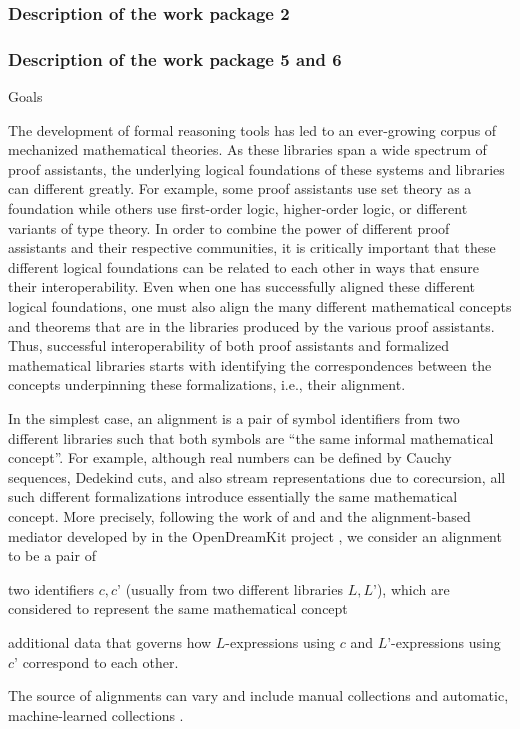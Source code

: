 \subsubsection{Description of the work package 2}

\subsubsection{Description of the work package 5 and 6}

{\color{red} Goals}

The development of formal reasoning tools has led to an ever-growing
corpus of mechanized mathematical theories. As these libraries span a
wide spectrum of proof assistants, the underlying logical foundations
of these systems and libraries can different greatly. For example,
some proof assistants use set theory as a foundation while others use
first-order logic, higher-order logic, or different variants of type
theory.  In order to combine the power of different proof assistants
and their respective communities, it is critically important that
these different logical foundations can be related to each other in
ways that ensure their interoperability.  Even when one has
successfully aligned these different logical foundations, one must
also align the many different mathematical concepts and theorems that
are in the libraries produced by the various proof assistants. Thus,
successful interoperability of both proof assistants and formalized
mathematical libraries starts with identifying the correspondences
between the concepts underpinning these formalizations, i.e., their
alignment.

In the simplest case, an alignment is a pair of symbol identifiers
from two different libraries such that both symbols are ``the same
informal mathematical concept''. For example, although real numbers
can be defined by Cauchy sequences, Dedekind cuts, and also stream
representations due to corecursion, all such different formalizations
introduce essentially the same mathematical concept. More precisely,
following the work of  and 
\cite{GKKMR:alignments:17} and the alignment-based mediator developed
by  in the OpenDreamKit project \cite{ODK:mitm:18}, we
consider an alignment to be a pair of
\begin{compactitem}
  \item two identifiers $c,c’$ (usually from two different libraries
    $L,L’$), which are considered to represent the same mathematical
    concept
  \item additional data that governs how $L$-expressions using $c$ and
    $L’$-expressions using $c’$ correspond to each other.
\end{compactitem}
The source of alignments can vary and include manual collections
\cite{MRLR:alignments:17} and automatic, machine-learned collections
\cite{align_kaliszyk}.

